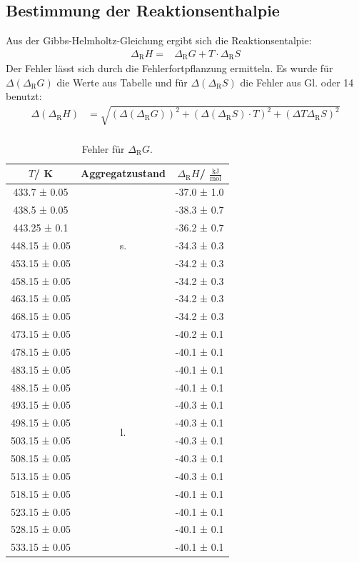 \documentclass[12pt,a4paper,titlepage,headinclude,bibtotoc]{scrartcl}
\begin{document}
\subsection{Bestimmung der Reaktionsenthalpie}
Aus der Gibbs-Helmholtz-Gleichung ergibt sich die Reaktionsentalpie:
\begin{align}
\Delta_\text{R} H=& \Delta_\text{R} G +{T} \cdot \Delta_\text{R} S
\end{align}
Der Fehler lässt sich durch die Fehlerfortpflanzung ermitteln. Es wurde für $\Delta(\Delta_\text{R} G)$ die Werte aus Tabelle und für $\Delta(\Delta_\text{R} S)$ die Fehler aus Gl. oder 14 benutzt:
\begin{align}
\Delta(\Delta_\text{R}  H)&= \sqrt{(\Delta(\Delta_\text{R} G))^2 + (\Delta(\Delta_\text{R} S) \cdot {T})^2 +(\Delta {T} \Delta_\text{R} S)^2}\\
\end{align}
\begin{table}[h]
\centering
\caption{Fehler für $\Delta_\text{R} G$.}
\begin{tabular}{c|c|c}
$T$/ K &Aggregatzustand&$\Delta_\text{R} H$/ \;$\frac{\text{kJ}}{\text{mol}}$ \\
\hline
433.7 ± 0.05 & \multirow{7}{*}{s.} & -37.0 ± 1.0\\
438.5 ± 0.05   &  & -38.3 ± 0.7 \\
443.25 ± 0.1  &  & -36.2 ± 0.7\\
448.15 ± 0.05&  &-34.3 ± 0.3\\
453.15 ± 0.05&  &-34.2 ± 0.3\\
458.15 ± 0.05&  &-34.2 ± 0.3\\
463.15 ± 0.05&  &-34.2 ± 0.3\\
468.15 ± 0.05&  &-34.2 ± 0.3\\
\hline
473.15 ± 0.05& \multirow{12}{*}{l.} &-40.2 ± 0.1\\
478.15 ± 0.05&  &-40.1 ± 0.1\\
483.15 ± 0.05&  &-40.1 ± 0.1\\
488.15 ± 0.05&  &-40.1 ± 0.1\\
493.15 ± 0.05&  &-40.3 ± 0.1\\
498.15 ± 0.05&  &-40.3 ± 0.1\\
503.15 ± 0.05&  &-40.3 ± 0.1\\
508.15 ± 0.05&  &-40.3 ± 0.1\\
513.15 ± 0.05&  &-40.3 ± 0.1\\
518.15 ± 0.05&  &-40.1 ± 0.1\\
523.15 ± 0.05&  &-40.1 ± 0.1\\
528.15 ± 0.05&  &-40.1 ± 0.1\\
533.15 ± 0.05&  &-40.1 ± 0.1\\
\end{tabular}
\end{table}
\end{document}
